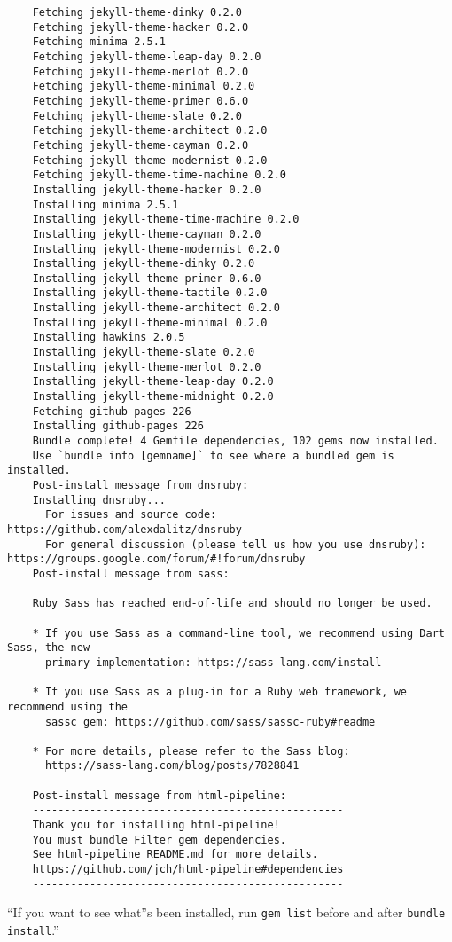 \documentclass{article}
\numberwithin{equation}{section}
\begin{document}
\begin{verbatim}
	Fetching jekyll-theme-dinky 0.2.0
	Fetching jekyll-theme-hacker 0.2.0
	Fetching minima 2.5.1
	Fetching jekyll-theme-leap-day 0.2.0
	Fetching jekyll-theme-merlot 0.2.0
	Fetching jekyll-theme-minimal 0.2.0
	Fetching jekyll-theme-primer 0.6.0
	Fetching jekyll-theme-slate 0.2.0
	Fetching jekyll-theme-architect 0.2.0
	Fetching jekyll-theme-cayman 0.2.0
	Fetching jekyll-theme-modernist 0.2.0
	Fetching jekyll-theme-time-machine 0.2.0
	Installing jekyll-theme-hacker 0.2.0
	Installing minima 2.5.1
	Installing jekyll-theme-time-machine 0.2.0
	Installing jekyll-theme-cayman 0.2.0
	Installing jekyll-theme-modernist 0.2.0
	Installing jekyll-theme-dinky 0.2.0
	Installing jekyll-theme-primer 0.6.0
	Installing jekyll-theme-tactile 0.2.0
	Installing jekyll-theme-architect 0.2.0
	Installing jekyll-theme-minimal 0.2.0
	Installing hawkins 2.0.5
	Installing jekyll-theme-slate 0.2.0
	Installing jekyll-theme-merlot 0.2.0
	Installing jekyll-theme-leap-day 0.2.0
	Installing jekyll-theme-midnight 0.2.0
	Fetching github-pages 226
	Installing github-pages 226
	Bundle complete! 4 Gemfile dependencies, 102 gems now installed.
	Use `bundle info [gemname]` to see where a bundled gem is installed.
	Post-install message from dnsruby:
	Installing dnsruby...
	  For issues and source code: https://github.com/alexdalitz/dnsruby
	  For general discussion (please tell us how you use dnsruby): https://groups.google.com/forum/#!forum/dnsruby
	Post-install message from sass:
	
	Ruby Sass has reached end-of-life and should no longer be used.
	
	* If you use Sass as a command-line tool, we recommend using Dart Sass, the new
	  primary implementation: https://sass-lang.com/install
	
	* If you use Sass as a plug-in for a Ruby web framework, we recommend using the
	  sassc gem: https://github.com/sass/sassc-ruby#readme
	
	* For more details, please refer to the Sass blog:
	  https://sass-lang.com/blog/posts/7828841
	
	Post-install message from html-pipeline:
	-------------------------------------------------
	Thank you for installing html-pipeline!
	You must bundle Filter gem dependencies.
	See html-pipeline README.md for more details.
	https://github.com/jch/html-pipeline#dependencies
	-------------------------------------------------
\end{verbatim}
``If you want to see what''s been installed, run \texttt{gem list} before and after \texttt{bundle install}.''
\end{document}

